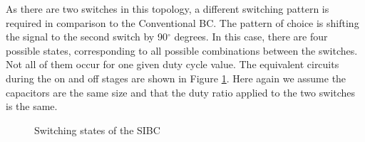 As there are two switches in this topology, a different switching pattern is required in comparison to the Conventional BC. The pattern of choice is shifting the signal to the second switch by 90$^\circ$ degrees.
In this case, there are four possible states, corresponding to all possible combinations between the switches. Not all of them occur for one given duty cycle value. 
The equivalent circuits during the on and off stages are shown in Figure \ref{fig:CTLBC_States}. Here again we assume the capacitors are the same size and that the duty ratio applied to the two switches is the same. 
\vspace{-5mm}
\begin{figure}[H]%
    \centering
    \qquad
   \qquad
    \qquad
    \caption{Switching states of the SIBC}%
     \label{fig:CTLBC_States}%
     
\end{figure}
